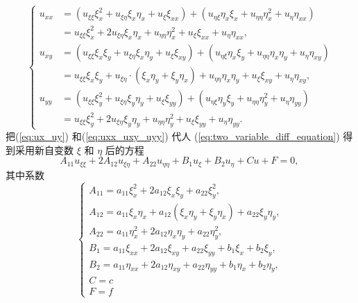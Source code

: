 \begin{equation}
    \left\{\begin{aligned}
        u_{x x} & =\left(u_{\xi \xi} \xi_x^2+u_{\xi \eta} \xi_x \eta_x+u_{\xi} \xi_{x x}\right)+\left(u_{\eta \xi} \eta_x \xi_x+u_{\eta \eta} \eta_x^2+u_\eta \eta_{x x}\right) \\
        & =u_{\xi \xi} \xi_x^2+2 u_{\xi \eta} \xi_x \eta_x+u_{\eta \eta} \eta_x^2+u_{\xi} \xi_{x x}+u_\eta \eta_{x x}, \\
        u_{x y} & =\left(u_{\xi \xi} \xi_x \xi_y+u_{\xi \eta} \xi_x \eta_y+u_{\xi} \xi_{x y}\right)+\left(u_{\eta \xi} \eta_x \xi_y+u_{\eta \eta} \eta_x \eta_y+u_\eta \eta_{x y}\right) \\
        & =u_{\xi \xi} \xi_x \xi_y+u_{\xi \eta} \cdot\left(\xi_x \eta_y+\xi_y \eta_x\right)+u_{\eta \eta} \eta_x \eta_y+u_{\xi} \xi_{x y}+u_\eta \eta_{x y}, \\
        u_{y y} & =\left(u_{\xi \xi} \xi_y^2+u_{\xi \eta} \xi_y \eta_y+u_{\xi} \xi_{y y}\right)+\left(u_{\eta \xi} \eta_y \xi_y+u_{\eta \eta} \eta_y^2+u_\eta \eta_{y y}\right) \\
        & =u_{\xi \xi} \xi_y^2+2 u_{\xi \eta} \xi_y \eta_y+u_{\eta \eta} \eta_y^2+u_{\xi} \xi_{y y}+u_\eta \eta_{y y} .
        \end{aligned}\right.
        \label{eq:uxx_uxy_uyy}
\end{equation}
把(\ref{eq:ux_uy}) 和(\ref{eq:uxx_uxy_uyy}) 代人 (\ref{eq:two_variable_diff_equation}) 得到采用新自变数 $\xi$ 和 $\eta$ 后的方程
\begin{equation}
    A_{11} u_{\xi \xi}+2 A_{12} u_{\xi \eta}+A_{22} u_{\eta \eta}+B_1 u_{\xi}+B_2 u_\eta+C u+F=0 \text {, }
    \label{eq:two_variable_transformed_diff_equation}
\end{equation}
其中系数
\begin{equation}
    \left\{\begin{array}{l}A_{11}=a_{11} \xi_x^2+2 a_{12} \xi_x \xi_y+a_{22} \xi_y^2, 
        \\ 
        A_{12}=a_{11} \xi_x \eta_x+a_{12}\left(\xi_x \eta_y+\xi_y \eta_x\right)+a_{22} \xi_y \eta_y, 
        \\ A_{22}=a_{11} \eta_x^2+2 a_{12} \eta_x \eta_y+a_{22} \eta_y^2, 
        \\ B_1=a_{11} \xi_{x x}+2 a_{12} \xi_{x y}+a_{22} \xi_{y y}+b_1 \xi_x+b_2 \xi_y, 
        \\ B_2=a_{11} \eta_{x x}+2 a_{12} \eta_{x y}+a_{22} \eta_{y y}+b_1 \eta_x+b_2 \eta_y, 
        \\ C=c 
        \\ F=f\end{array}\right.
        \label{eq:transformed_coeff}
\end{equation}
